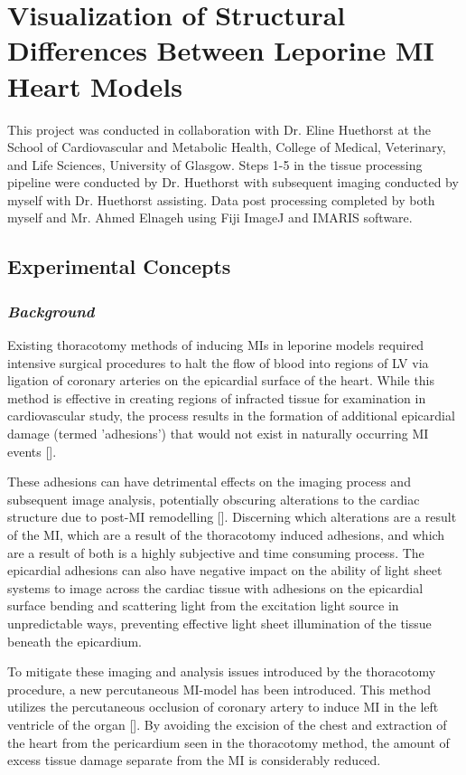 \section{Visualization of Structural Differences Between Leporine MI Heart Models}

This project was conducted in collaboration with Dr. Eline Huethorst at the School of Cardiovascular and Metabolic Health, College of Medical, Veterinary, and Life Sciences, University of Glasgow. Steps 1-5 in the tissue processing pipeline were conducted by Dr. Huethorst with subsequent imaging conducted by myself with Dr. Huethorst assisting. Data post processing completed by both myself and Mr. Ahmed Elnageh using Fiji ImageJ and IMARIS software. 


\subsection{Experimental Concepts}
\subsubsection{\textit{Background}}

Existing thoracotomy methods of inducing MIs in leporine models required intensive surgical procedures to halt the flow of blood into regions of LV via ligation of coronary arteries on the epicardial surface of the heart. While this method is effective in creating regions of infracted tissue for examination in cardiovascular study, the process results in the formation of additional epicardial damage (termed 'adhesions') that would not exist in naturally occurring MI events []. 

These adhesions can have detrimental effects on the imaging process and subsequent image analysis, potentially obscuring alterations to the cardiac structure due to post-MI remodelling []. Discerning which alterations are a result of the MI, which are a result of the thoracotomy induced adhesions, and which are a result of both is a highly subjective and time consuming process. The epicardial adhesions can also have negative impact on the ability of light sheet systems to image across the cardiac tissue with adhesions on the epicardial surface bending and scattering light from the excitation light source in unpredictable ways, preventing effective light sheet illumination of the tissue beneath the epicardium. 

To mitigate these imaging and analysis issues introduced by the thoracotomy procedure, a new percutaneous MI-model has been introduced. This method utilizes the percutaneous occlusion of coronary artery to induce MI in the left ventricle of the organ []. By avoiding the excision of the chest and extraction of the heart from the pericardium seen in the thoracotomy method, the amount of excess tissue damage separate from the MI is considerably reduced. 

